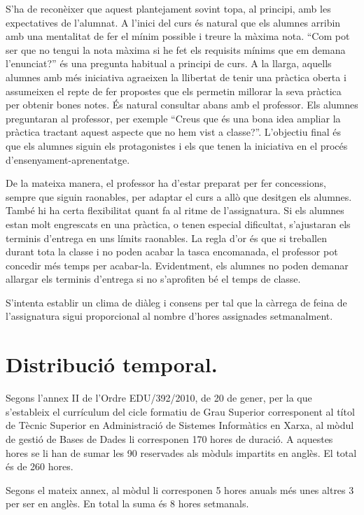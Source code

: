 \documentclass[catalan, a4paper, 12pt, titlepage]{article}
\begin{document}
S'ha de reconèixer que aquest plantejament sovint topa, al principi, amb les expectatives de l'alumnat.
A l'inici del curs és natural que els alumnes arribin amb una mentalitat de fer el mínim possible i treure la màxima nota.
``Com pot ser que no tengui la nota màxima si he fet els requisits mínims que em demana l'enunciat?'' és una pregunta habitual a principi de curs.
A la llarga, aquells alumnes amb més iniciativa agraeixen la llibertat de tenir una pràctica oberta i assumeixen el repte de fer propostes que els permetin millorar la seva pràctica per obtenir bones notes.
És natural consultar abans amb el professor. 
Els alumnes preguntaran al professor, per exemple ``Creus que és una bona idea ampliar la pràctica tractant aquest aspecte que no hem vist a classe?''.
L'objectiu final és que els alumnes siguin els protagonistes i els que tenen la iniciativa en el procés d'ensenyament-aprenentatge.

De la mateixa manera, el professor ha d'estar preparat per fer concessions, sempre que siguin raonables, per adaptar el curs a allò que desitgen els alumnes.
També hi ha certa flexibilitat quant fa al ritme de l'assignatura. 
Si els alumnes estan molt engrescats en una pràctica, o tenen especial dificultat, s'ajustaran els terminis d'entrega en uns límits raonables.
La regla d'or és que si treballen durant tota la classe i no poden acabar la tasca encomanada, el professor pot concedir més temps per acabar-la.
Evidentment, els alumnes no poden demanar allargar els terminis d'entrega si no s'aprofiten bé el temps de classe.

S'intenta establir un clima de diàleg i consens per tal que la càrrega de feina de l'assignatura sigui proporcional al nombre d'hores assignades setmanalment.


\section{Distribució temporal.}
\label{sec:distribució}

Segons l'annex II de l'Ordre EDU/392/2010, de 20 de gener, per la que s'estableix el currículum del cicle formatiu de Grau Superior corresponent al títol de Tècnic Superior en Administració de Sistemes Informàtics en Xarxa, al mòdul de gestió de Bases de Dades li corresponen 170 hores de duració. A aquestes hores se li han de sumar les 90 reservades als mòduls impartits en anglès. El total és de 260 hores.

Segons el mateix annex, al mòdul li corresponen 5 hores anuals més unes altres 3 per ser en anglès. En total la suma és 8 hores setmanals.
\end{document}
